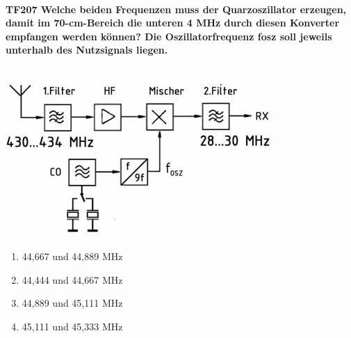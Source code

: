 \documentclass[8pt]{article}
\begin{document}
\begin{enumerate}
\paragraph*{TF207 Welche beiden Frequenzen muss der Quarzoszillator erzeugen, damit im 70-cm-Bereich die unteren 4 MHz durch diesen Konverter empfangen werden können? Die Oszillatorfrequenz fosz soll jeweils unterhalb des Nutzsignals liegen.}
\begin{center}
	\begin{minipage}{\linewidth}
		\centering
		\includegraphics[scale=1.0]{pics/tf207_a.jpg}
	\end{minipage}
\end{center}
\begin{enumerate}[nolistsep,label=\Alph*]
\item 44,667 und 44,889 MHz
\item 44,444 und 44,667 MHz
\item 44,889 und 45,111 MHz
\item 45,111 und 45,333 MHz
\end{enumerate}


\end{enumerate}
\end{document}
